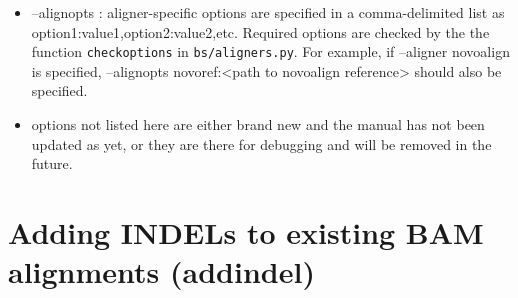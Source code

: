 \documentclass[letterpaper,11pt]{article}
\begin{document}
\begin{itemize}
\item --alignopts : aligner-specific options are specified in a comma-delimited list as option1:value1,option2:value2,etc. Required options are checked by the the function \texttt{checkoptions} in \texttt{bs/aligners.py}. For example, if --aligner novoalign is specified, --alignopts novoref:<path to novoalign reference> should also be specified.
\item options not listed here are either brand new and the manual has not been updated as yet, or they are there for debugging and will be removed in the future.
\end{itemize}


\section{Adding INDELs to existing BAM alignments (addindel)}
\end{document}
